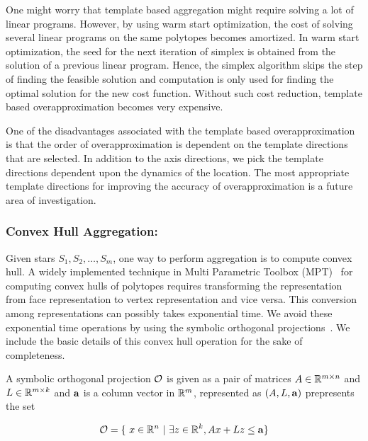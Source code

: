 One might worry that template based aggregation might require solving a lot of linear programs. 
%
However, by using warm start optimization, the cost of solving several linear programs on the same polytopes becomes amortized. 
%
In warm start optimization, the seed for the next iteration of simplex is obtained from the solution of a previous linear program.
%
Hence, the simplex algorithm skips the step of finding the feasible solution and computation is only used for finding the optimal solution for the new cost function.
%
Without such cost reduction, template based overapproximation becomes very expensive. 
%

One of the disadvantages associated with the template based overapproximation is that the order of overapproximation is dependent on the template directions that are selected. 
%
In addition to the axis directions, we pick the template directions dependent upon the dynamics of the location. 
%
The most appropriate template directions for improving the accuracy of overapproximation is a future area of investigation.

\subsubsection{Convex Hull Aggregation:}
\label{sec:convexhullAgg}
Given stars $S_1, S_2, \ldots, S_m$, one way to perform aggregation is to compute convex hull. 
%
A widely implemented technique in Multi Parametric Toolbox (MPT)~\cite{kvasnica2004multi} for computing convex hulls of polytopes requires transforming the representation from face representation to vertex representation and vice versa. 
%
This conversion among representations can possibly takes exponential time. 
%
We avoid these exponential time operations by using the symbolic orthogonal projections~\cite{hagemann2014reachability}. 
%
We include the basic details of this convex hull operation for the sake of completeness.

\begin{definition}
A symbolic orthogonal projection $\mathcal{O}$ is given as a pair of matrices $A \in \reals^{m \times n}$ and $L \in \reals^{m \times k}$ and ${\bf a}$ is a column vector in $\reals^m$, represented as $(A, L, {\bf a})$ prepresents the set

$$
\O = \{~x \in \reals^n~|~ \exists z \in \reals^k, Ax + Lz \leq {\bf a}\}
$$ 
\end{definition}

